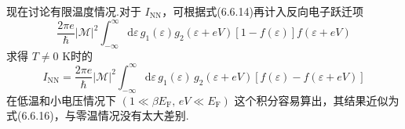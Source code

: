 现在讨论有限温度情况.对于 $I_{\mathrm{NN}}$，可根据式(6.6.14)再计入反向电子跃迁项
\begin{equation*}
  \frac{2\pi e}{\hbar}|\mathscr{M}|^{2}\int_{-\infty}^{\infty}
  \mathrm{d}\varepsilon\,g_{1}(\varepsilon)g_{2}(\varepsilon+eV)
  \left[1-f(\varepsilon)\right]f(\varepsilon+eV)
\end{equation*}
求得 $T\neq0$ K时的
\begin{equation}
  I_{\mathrm{NN}}=\frac{2\pi e}{\hbar}|\mathscr{M}|^{2}
  \int_{-\infty}^{\infty}\mathrm{d}\varepsilon\,g_{1}(\varepsilon)\,
  g_{2}(\varepsilon+eV)
  \left[f(\varepsilon)-f(\varepsilon+eV)\right]
\end{equation}
在低温和小电压情况下 $\left(1\ll\beta E_{\mathrm{F}},\,eV\ll E_{\mathrm{F}}\right)$ 这个积分容易算出，其结果近似为式(6.6.16)，与零温情况没有太大差别.

